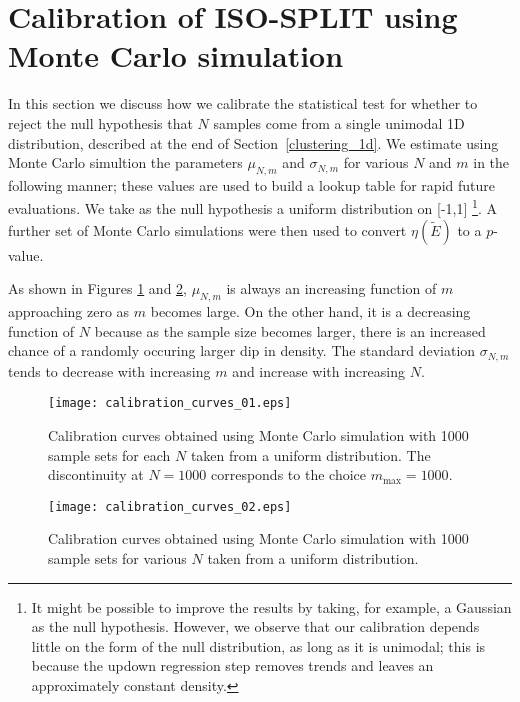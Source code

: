 \documentclass[10pt]{article}
\begin{document}
\section {Calibration of ISO-SPLIT using Monte Carlo simulation}

\label{monte-carlo}

In this section we discuss how we calibrate the statistical test for whether to reject the null hypothesis that $N$ samples come from a single unimodal 1D distribution, described at the end of Section~\ref{clustering_1d}. We estimate using Monte Carlo simultion the parameters $\mu_{N,m}$ and $\sigma_{N,m}$ for various $N$ and $m$ in the following manner; these values are used to build a lookup table for rapid future evaluations. We take as the null hypothesis a uniform distribution on [-1,1] \footnote{It might be possible to improve the results by taking, for example, a Gaussian as the null hypothesis. However, we observe that our calibration depends little on the form of the null distribution, as long as it is unimodal; this is because the updown regression step removes trends and leaves an approximately constant density.}. A further set of Monte Carlo simulations were then used to convert $\eta(\tilde{E})$ to a $p$-value.

As shown in Figures \ref{fig:calibration_curves_01} and \ref{fig:calibration_curves_02}, $\mu_{N,m}$ is always an increasing function of $m$ approaching zero as $m$ becomes large. On the other hand, it is a decreasing function of $N$ because as the sample size becomes larger, there is an increased chance of a randomly occuring larger dip in density. The standard deviation $\sigma_{N,m}$ tends to decrease with increasing $m$ and increase with increasing $N$.

\begin{figure}
\begin{center}
\texttt{[image: calibration\_curves\_01.eps]}
\end{center}
\caption{
Calibration curves obtained using Monte Carlo simulation with 1000 sample sets for each $N$ taken from a uniform distribution. The discontinuity at $N=1000$ corresponds to the choice $m_\text{max}=1000$.
}
\label{fig:calibration_curves_01}
\end{figure}

\begin{figure}
\begin{center}
\texttt{[image: calibration\_curves\_02.eps]}
\end{center}
\caption{
Calibration curves obtained using Monte Carlo simulation with 1000 sample sets for various $N$ taken from a uniform distribution.
}
\label{fig:calibration_curves_02}
\end{figure}
\end{document}
